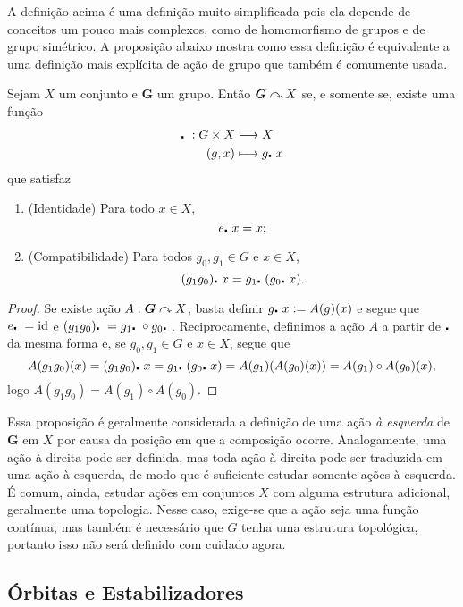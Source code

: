 A definição acima é uma definição muito simplificada pois ela depende de conceitos um pouco mais complexos, como de homomorfismo de grupos e de grupo simétrico. A proposição abaixo mostra como essa definição é equivalente a uma definição mais explícita de ação de grupo que também é comumente usada.

\begin{prop}
Sejam $X$ um conjunto e $\bm G$ um grupo. Então $\bm G \curvearrowright X$ se, e somente se, existe uma função
	\begin{align*}
	{\mathord{\centerdot}\ }: {G \times X} &\longrightarrow {X} \\{(g,x)} &\longmapsto {g\mathord{\centerdot}\ x}
	\end{align*}
que satisfaz
\begin{enumerate}
\item (Identidade) Para todo $x \in X$,
	\begin{equation*}
	e \mathord{\centerdot}\  x = x;
	\end{equation*}
\item (Compatibilidade) Para todos $g_0,g_1 \in G$ e $x \in X$,
	\begin{equation*}
	(g_1g_0) \mathord{\centerdot}\  x = g_1 \mathord{\centerdot}\  (g_0 \mathord{\centerdot}\  x).
	\end{equation*}
\end{enumerate}
\end{prop}
\begin{proof}
Se existe ação $A: \bm G \curvearrowright X$, basta definir $g \mathord{\centerdot}\  x := A(g)(x)$ e segue que $e\mathord{\centerdot}\  = \mathrm{id}$ e $(g_1g_0) \mathord{\centerdot}\  = g_1 \mathord{\centerdot}\  \circ g_0 \mathord{\centerdot}\ $. Reciprocamente, definimos a ação $A$ a partir de $\mathord{\centerdot}\ $ da mesma forma e, se $g_0,g_1 \in G$ e $x \in X$, segue que
	\begin{equation*}
	A(g_1g_0)(x) =(g_1g_0) \mathord{\centerdot}\  x = g_1 \mathord{\centerdot}\  (g_0 \mathord{\centerdot}\  x) = A(g_1)(A(g_0)(x)) = A(g_1) \circ A(g_0)(x),
	\end{equation*}
logo $A(g_1g_0)=A(g_1) \circ A(g_0)$.
\end{proof}

Essa proposição é geralmente considerada a definição de uma ação \emph{à esquerda} de $\bm G$ em $X$ por causa da posição em que a composição ocorre. Analogamente, uma ação à direita pode ser definida, mas toda ação à direita pode ser traduzida em uma ação à esquerda, de modo que é suficiente estudar somente ações à esquerda. É comum, ainda, estudar ações em conjuntos $X$ com alguma estrutura adicional, geralmente uma topologia. Nesse caso, exige-se que a ação seja uma função contínua, mas também é necessário que $G$ tenha uma estrutura topológica, portanto isso não será definido com cuidado agora.

\subsection{Órbitas e Estabilizadores}

